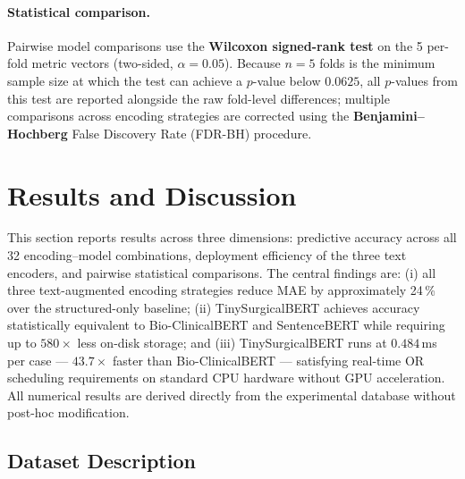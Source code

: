 \documentclass[3p]{elsarticle}
\begin{document}
\paragraph{Statistical comparison.}
Pairwise model comparisons use the \textbf{Wilcoxon signed-rank test} on the 5 per-fold metric vectors (two-sided, $\alpha = 0.05$). Because $n = 5$ folds is the minimum sample size at which the test can achieve a $p$-value below $0.0625$, all $p$-values from this test are reported alongside the raw fold-level differences; multiple comparisons across encoding strategies are corrected using the \textbf{Benjamini–Hochberg} False Discovery Rate (FDR-BH) procedure.



\section{Results and Discussion}\label{sec:results}

This section reports results across three dimensions: predictive accuracy across all 32 encoding–model combinations, deployment efficiency of the three text encoders, and pairwise statistical comparisons. The central findings are: (i) all three text-augmented encoding strategies reduce MAE by approximately 24\,\% over the structured-only baseline; (ii) TinySurgicalBERT achieves accuracy statistically equivalent to Bio-ClinicalBERT and SentenceBERT while requiring up to $580\times$ less on-disk storage; and (iii) TinySurgicalBERT runs at $0.484$\,ms per case — $43.7\times$ faster than Bio-ClinicalBERT — satisfying real-time OR scheduling requirements on standard CPU hardware without GPU acceleration. All numerical results are derived directly from the experimental database without post-hoc modification.

\subsection{Dataset Description}
\label{sec:dataset_desc}
\end{document}
